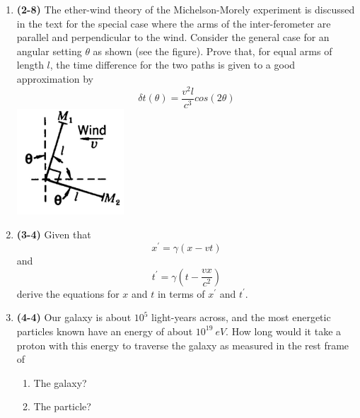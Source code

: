 \documentclass[fleqn]{article}
\begin{document}
  \begin{enumerate}
    \item \textbf{(2-8)} The ether-wind theory of the Michelson-Morely experiment is discussed in the text for 
    the special case where the arms of the inter-ferometer are parallel and perpendicular to the wind. Consider
    the general case for an angular setting $\theta$ as shown (see the figure). Prove that, for equal arms of length
    $l$, the time difference for the two paths is given to a good approximation by
    $$\delta t(\theta)=\dfrac{v^2 l}{c^3} cos(2 \theta)$$
    \includegraphics[height=4cm, width=4cm]{1.JPG}



    \item \textbf{(3-4)} Given that 
    $$x^'=\gamma (x-vt)$$
    and 
    $$t^'=\gamma (t-\dfrac{vx}{c^2})$$
    derive the equations for $x$ and $t$ in terms of $x^'$ and $t^'$.



    \item \textbf{(4-4)} Our galaxy is about $10^5$ light-years across, and the most energetic particles known
    have an energy of about $10^{19} ~ eV$. How long would it take a proton with this energy to traverse the galaxy
    as measured in the rest frame of 
    \begin{enumerate}
      \item The galaxy?



      \item The particle?



    \end{enumerate}

  \end{enumerate}
\end{document}
